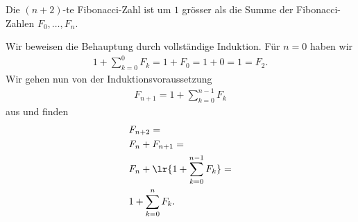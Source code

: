 \begin{myanswer}[myexercise:0309]
\begin{aenum}
    \item Die $(n+2)$-te Fibonacci-Zahl ist um $1$ grösser als die Summe der Fibonacci-Zahlen $F_0,\ldots, F_n$.
    \item Wir beweisen die Behauptung durch vollständige Induktion. Für $n = 0$ haben wir
    \begin{align*}
        1 + \sum_{k=0}^{0} F_k = 1 + F_0 = 1 + 0 = 1 = F_2.
    \end{align*}
    Wir gehen nun von der Induktionsvoraussetzung
    \begin{align*}
        F_{n+1} = 1 + \sum_{k=0}^{n-1} F_k
    \end{align*}
        aus und finden
        \begin{align*}
            &F_{n+2} = \\
            &F_n + F_{n+1} = \\
            &F_n + \lr{1 + \sum_{k=0}^{n-1}F_k} = \\
            &1 + \sum_{k=0}^{n} F_k.
        \end{align*}
\end{aenum}
\end{myanswer}

\clearpage
\shipoutAnswer
